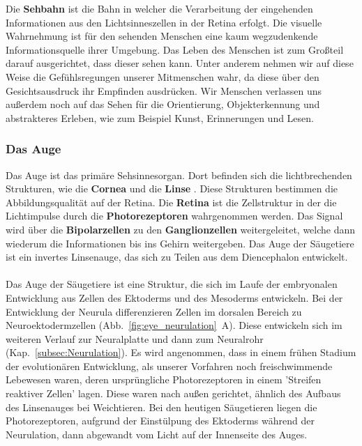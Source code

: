Die \textbf{Sehbahn} ist die Bahn in welcher die Verarbeitung der eingehenden Informationen aus den Lichtsinneszellen in der Retina erfolgt. Die visuelle Wahrnehmung ist für den sehenden Menschen eine kaum wegzudenkende Informationsquelle ihrer Umgebung. Das Leben des Menschen ist zum Großteil darauf ausgerichtet, dass dieser sehen kann. Unter anderem nehmen wir auf diese Weise die Gefühlsregungen unserer Mitmenschen wahr, da diese über den Gesichtsausdruck ihr Empfinden ausdrücken. Wir Menschen verlassen uns außerdem noch auf das Sehen für die Orientierung, Objekterkennung und abstrakteres Erleben, wie zum Beispiel Kunst, Erinnerungen und Lesen.


\subsubsection*{Das Auge}
Das Auge ist das primäre Sehsinnesorgan. Dort befinden sich die lichtbrechenden Strukturen, wie die \textbf{Cornea}  und die \textbf{Linse} . Diese Strukturen  bestimmen die Abbildungsqualität auf der Retina. Die \textbf{Retina} ist die Zellstruktur in der die Lichtimpulse durch die \textbf{Photorezeptoren} wahrgenommen werden. Das Signal wird über die \textbf{Bipolarzellen} zu den \textbf{Ganglionzellen} weitergeleitet, welche dann wiederum die Informationen bis ins Gehirn weitergeben.
Das Auge der Säugetiere ist ein invertes Linsenauge,  das sich zu Teilen aus dem Diencephalon entwickelt. 
\\
\\
Das Auge der Säugetiere ist eine Struktur, die sich im Laufe der embryonalen Entwicklung aus Zellen des Ektoderms und des Mesoderms entwickeln. Bei der Entwicklung der Neurula differenzieren Zellen im dorsalen Bereich zu Neuroektodermzellen  (Abb.~\ref{fig:eye_neurulation}~A). Diese entwickeln sich im weiteren Verlauf zur Neuralplatte und dann zum Neuralrohr (Kap.~\ref{subsec:Neurulation}). 
Es wird angenommen, dass in einem frühen Stadium der evolutionären Entwicklung, als unserer Vorfahren noch freischwimmende Lebewesen waren, deren ursprüngliche Photorezeptoren in einem 'Streifen reaktiver Zellen' lagen. Diese waren nach außen gerichtet, ähnlich des Aufbaus des Linsenauges bei Weichtieren. Bei den heutigen Säugetieren liegen die Photorezeptoren, aufgrund der Einstülpung des Ektoderms während der Neurulation, dann abgewandt vom Licht auf der Innenseite des Auges. 

